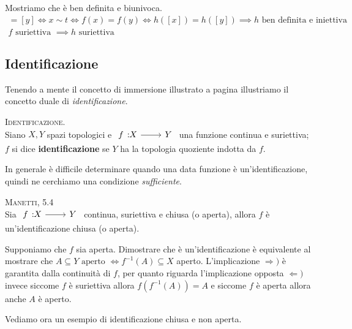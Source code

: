 Mostriamo che è ben definita e biunivoca.
	\begin{gather*}
		[x]=[y]\iff x\sim t\iff f(x)=f(y)\iff h([x])=h([y]) \implies h \text{ ben definita e iniettiva }\\
		f \text{ suriettiva } \implies h \text{ suriettiva}
	\end{gather*}
\subsection{Identificazione}
Tenendo a mente il concetto di immersione illustrato a pagina \pageref{immersione} illustriamo il concetto duale di \textit{identificazione}.
\begin{define}\textsc{Identificazione.}\\
	Siano $X,Y$ spazi topologici e $\funz f X Y$ una funzione continua e suriettiva; $f$ si dice \textbf{identificazione} se $Y$ ha la topologia quoziente indotta da $f$.
\end{define}
In generale è difficile determinare quando una data funzione è un'identificazione, quindi ne cerchiamo una condizione \textit{sufficiente}. 
\begin{theorema} \textsc{Manetti, 5.4} \label{condizione sufficiente identificazione}\\
	Sia $\funz f X Y$ continua, suriettiva e chiusa (o aperta), allora $f$ è un'identificazione chiusa (o aperta).
\end{theorema}
\begin{demonstration}
	Supponiamo che $f$ sia aperta. Dimostrare che è un'identificazione è equivalente al mostrare che $\displaystyle A\subseteq Y \text{ aperto } \iff f^{-1}(A)\subseteq X$ aperto. L'implicazione $\Rightarrow)$ è garantita dalla continuità di $f$, per quanto riguarda l'implicazione opposta $\Leftarrow)$ invece siccome $f$ è suriettiva allora $f(f^{-1}(A))=A$ e siccome $f$ è aperta allora anche $A$ è aperto.
\end{demonstration}
Vediamo ora un esempio di identificazione chiusa e non aperta.
